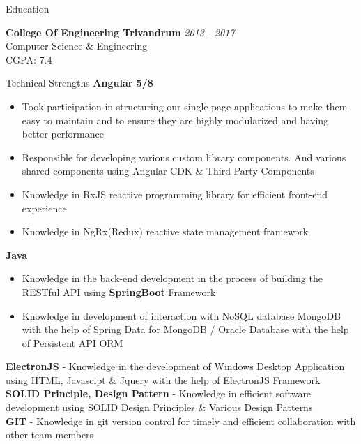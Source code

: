 \documentclass{resume} %
\begin{document}

\begin{rSection}{Education}

{\bf College Of Engineering Trivandrum} \hfill {\em 2013 - 2017} 
\\ Computer Science \& Engineering
\\ CGPA: 7.4



\end{rSection}




\begin{rSection}{Technical Strengths}
{\bf Angular 5/8}
\begin{itemize}
    \item Took participation in structuring our single page applications to make them easy to maintain and to ensure they are highly modularized and having better performance
    \item Responsible for developing various custom library components. And various shared components using Angular CDK \& Third Party Components
    \item Knowledge in RxJS reactive programming library for efficient front-end experience 
   \item Knowledge in NgRx(Redux) reactive state management framework
\end{itemize}

{\bf Java}
\begin{itemize}
    \item Knowledge in the back-end development in the process of building the RESTful API using \textbf{ SpringBoot } Framework
    \item Knowledge in  development of interaction with NoSQL database MongoDB with the help of Spring Data for MongoDB / Oracle Database with the help of Persistent API ORM
\end{itemize}
{\bf ElectronJS} - {Knowledge in the development of Windows Desktop Application using HTML, Javascipt \& Jquery with the help of ElectronJS Framework }
        \newline
{\bf SOLID Principle, Design Pattern} - {Knowledge in efficient software development using SOLID Design Principles \& Various Design Patterns}
\\
{\bf GIT } - {Knowledge in git version control for timely and efficient collaboration with other team members }
\end{rSection}
\end{document}
